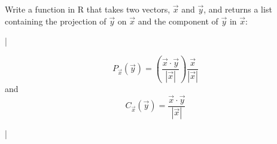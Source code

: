 \begin{assignment}
Write a function in R that takes two vectors, $\vec{x}$ and $\vec{y}$, and returns a list containing the projection of $\vec{y}$ on $\vec{x}$ and the component of $\vec{y}$ in $\vec{x}$:

\lstDeleteShortInline|

\[P_{\vec{x}}(\vec{y}) = \left(\frac{\vec{x} \cdot \vec{y}}{|\vec{x}|}\right) \frac{\vec{x}}{|\vec{x}|}\]
and 
\[C_{\vec{x}}(\vec{y}) = \frac{\vec{x} \cdot \vec{y}}{|\vec{x}|}\]

\lstMakeShortInline|

\end{assignment}

